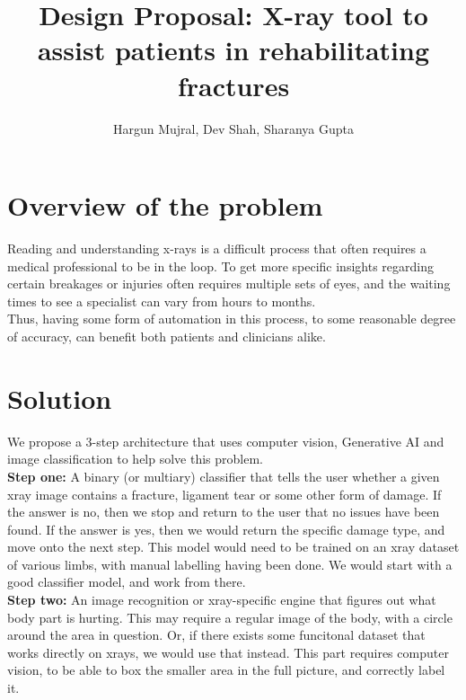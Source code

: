 \documentclass[runningheads]{llncs}
\begin{document}
%
\title{Design Proposal: X-ray tool to assist patients in rehabilitating fractures}
%
%
\author{Hargun Mujral, Dev Shah, Sharanya Gupta}
\maketitle              %

\section{Overview of the problem}
Reading and understanding x-rays is a difficult process that often requires a medical professional to be in the loop. To get more specific insights regarding certain breakages or injuries often requires multiple sets of eyes, and the waiting times to see a specialist can vary from hours to months. 
\\

\noindent Thus, having some form of automation in this process, to some reasonable degree of accuracy, can benefit both patients and clinicians alike. 

\section{Solution}

\noindent We propose a 3-step architecture that uses computer vision, Generative AI and image classification to help solve this problem.\\

\textbf{Step one:} A binary (or multiary) classifier that tells the user whether a given xray image contains a fracture, ligament tear or some other form of damage. If the answer is no, then we stop and return to the user that no issues have been found. If the answer is yes, then we would return the specific damage type, and move onto the next step. This model would need to be trained on an xray dataset of various limbs, with manual labelling having been done. We would start with a good classifier model, and work from there. \\

\textbf{Step two:}  An image recognition or xray-specific engine that figures out what body part is hurting. This may require a regular image of the body, with a circle around the area in question. Or, if there exists some funcitonal dataset that works directly on xrays, we would use that instead. This part requires computer vision, to be able to box the smaller area in the full picture, and correctly label it. \\
\end{document}
